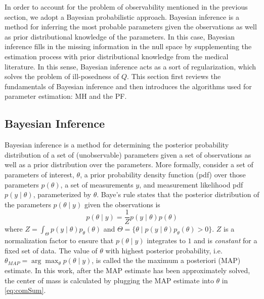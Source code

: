In order to account for the problem of observability mentioned in the previous section, we adopt a Bayesian probabilistic approach. 
Bayesian inference is a method for inferring the most probable parameters given the observations as well as prior distributional knowledge of the parameters. In this case, Bayesian 
inference fills in the missing information in the null space by supplementing the estimation process with prior distributional knowledge from the medical literature.
In this sense, Bayesian inference acts as a sort of regularization, which solves the problem of ill-posedness of $Q$. 
This section first reviews the fundamentals of Bayesian inference and then introduces the algorithms used for parameter estimation: MH and the PF.


\subsection{Bayesian Inference}
Bayesian inference is a method for determining the posterior probability distribution of a set of (unobservable) parameters given a set of observations as well as a prior distribution over the parameters. 
More formally, consider a set of parameters of interest, $\theta$, a prior probability density function (pdf) over those parameters $p(\theta)$, a set of measurements $y$, and measurement likelihood pdf $p(y\mid \theta)$, parameterized by  $\theta$. Baye's rule states that the posterior distribution of the parameters $p(\theta \mid y)$ given the observations is
\begin{equation}
p(\theta \mid y) = \frac{1}{Z} p(y \mid \theta)p(\theta)
\end{equation}
where $Z = \int_\Theta p(y \mid \theta)p_\theta(\theta)$ and $\Theta = \{\theta \mid p(y \mid \theta)p_\theta(\theta)>0\}$. $Z$ is a normalization factor to ensure that $p(\theta \mid y)$ integrates to $1$ and is \emph{constant} for a fixed set of data. The value of $\theta$ with highest posterior probability, i.e. $\theta_{MAP} = \arg\max_\theta p(\theta \mid y)$, is called the the maximum a posteriori (MAP) estimate. In this work, after the MAP estimate has been approximately solved, the center of mass is calculated by plugging the MAP estimate into $\theta$ in \eqref{eq:comSum}.

